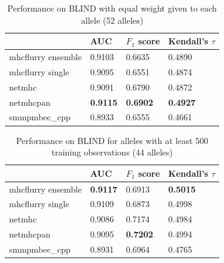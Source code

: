 \begin{table}[h]
\centering
\begin{tabular}{llll}
\toprule
{} &              AUC &      $F_1$ score & Kendall's $\tau$ \\
\midrule
mhcflurry ensemble &           0.9103 &           0.6635 &           0.4890 \\
mhcflurry single   &           0.9095 &           0.6551 &           0.4874 \\
netmhc             &           0.9091 &           0.6790 &           0.4872 \\
netmhcpan          &  \textbf{0.9115} &  \textbf{0.6902} &  \textbf{0.4927} \\
smmpmbec_cpp       &           0.8933 &           0.6555 &           0.4661 \\
\bottomrule
\end{tabular}

\caption{Performance on BLIND with equal weight given to each allele (52 alleles)}
\label{tab:alleleweighted}
\end{table}

\begin{table}[h]
\centering
\begin{tabular}{llll}
\toprule
{} &              AUC &      $F_1$ score & Kendall's $\tau$ \\
\midrule
mhcflurry ensemble &  \textbf{0.9117} &           0.6913 &  \textbf{0.5015} \\
mhcflurry single   &           0.9109 &           0.6873 &           0.4998 \\
netmhc             &           0.9086 &           0.7174 &           0.4984 \\
netmhcpan          &           0.9095 &  \textbf{0.7202} &           0.4994 \\
smmpmbec_cpp       &           0.8931 &           0.6964 &           0.4765 \\
\bottomrule
\end{tabular}

\caption{Performance on BLIND for alleles with at least 500 training observations (44 alleles)}
\label{tab:alleleweightedbig}
\end{table}


